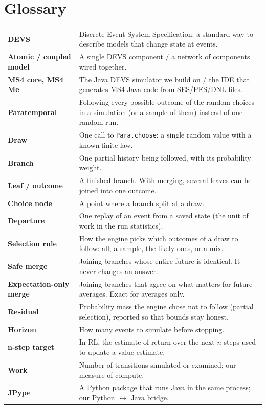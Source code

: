 \documentclass[11pt]{article}
\newcommand{\code}[1]{\texttt{#1}}
\begin{document}
\section{Glossary}\label{app:glossary}
\begin{tabularx}{\linewidth}{@{}>{\bfseries}p{3.4cm}Y@{}}
\toprule
DEVS & Discrete Event System Specification: a standard way to describe models that change state at events.\\
Atomic / coupled model & A single DEVS component / a network of components wired together.\\
MS4 core, MS4 Me & The Java DEVS simulator we build on / the IDE that generates MS4 Java code from SES/PES/DNL files.\\
Paratemporal & Following every possible outcome of the random choices in a simulation (or a sample of them) instead
  of one random run.\\
Draw & One call to \code{Para.choose}: a single random value with a known finite law.\\
Branch & One partial history being followed, with its probability weight.\\
Leaf / outcome & A finished branch. With merging, several leaves can be joined into one outcome.\\
Choice node & A point where a branch split at a draw.\\
Departure & One replay of an event from a saved state (the unit of work in the run statistics).\\
Selection rule & How the engine picks which outcomes of a draw to follow: all, a sample, the likely ones, or a mix.\\
Safe merge & Joining branches whose entire future is identical. It never changes an answer.\\
Expectation-only merge & Joining branches that agree on what matters for future averages. Exact for averages only.\\
Residual & Probability mass the engine chose not to follow (partial selection), reported so that bounds stay honest.\\
Horizon & How many events to simulate before stopping.\\
n-step target & In RL, the estimate of return over the next $n$ steps used to update a value estimate.\\
Work & Number of transitions simulated or examined; our measure of compute.\\
JPype & A Python package that runs Java in the same process; our Python $\leftrightarrow$ Java bridge.\\
\bottomrule
\end{tabularx}
\end{document}

